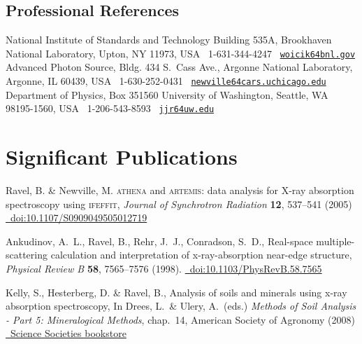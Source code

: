 \documentclass[11pt]{moderncv}
\begin{document}
\subsection{Professional References}
%
{National Institute of Standards and Technology\newline
  Building 535A, Brookhaven National Laboratory, Upton, NY 11973, USA\newline
  \phonesymbol\ 1-631-344-4247\quad
  \emailsymbol\ \href{mailto:woicik@bnl.gov}{\footnotesize\texttt{woicik\char64bnl.gov}}}
%
{Advanced Photon Source, Bldg. 434 S.\ Cass Ave., Argonne National Laboratory, Argonne, IL 60439, USA\newline
  \phonesymbol\ 1-630-252-0431\quad
  \emailsymbol\ \href{mailto:newville@cars.uchicago.edu}
  {\footnotesize\texttt{newville\char64cars.uchicago.edu}}}
%
{Department of Physics, Box 351560\newline
  University of Washington, Seattle, WA 98195-1560, USA\newline
  \phonesymbol\ 1-206-543-8593\quad
  \emailsymbol\ \href{mailto:jjr@uw.edu}{\footnotesize\texttt{jjr\char64uw.edu}}}

\section{Significant Publications}
\label{sec:highlights}

%
{\small Ravel, B. \& Newville, M. \textsc{athena} and
  \textsc{artemis}: data analysis for X-ray absorption spectroscopy
  using \textsc{ifeffit}, \emph{Journal of Synchrotron Radiation}
  \textbf{12}, 537--541 (2005)
  \href{http://dx.doi.org/10.1107/S0909049505012719}
  {\color{quotecolor}\homepagesymbol~doi:10.1107/S0909049505012719}}

%
{\small Ankudinov, A.~L., Ravel, B., Rehr, J.~J., Conradson, S.~D.,
  Real-space multiple-scattering calculation and interpretation of
  x-ray-absorption near-edge structure, \emph{Physical Review B}
  \textbf{58}, 7565--7576 (1998).
  \href{http://dx.doi.org/10.1103/PhysRevB.58.7565}
  {\color{quotecolor}\homepagesymbol~doi:10.1103/PhysRevB.58.7565}}

%
{\small Kelly, S., Hesterberg, D. \& Ravel, B., Analysis of soils and
  minerals using x-ray absorption spectroscopy, In Drees, L.\ \&
  Ulery, A.\ (eds.)  \emph{Methods of Soil Analysis - Part 5:
    Mineralogical Methods}, chap.~14, American Society of Agronomy
  (2008)
  \href{https://portal.sciencesocieties.org/Purchase/ProductDetail.aspx?Product_code=802f0511-76f0-dc11-b6b8-0013210e308c}
  {\color{quotecolor}\homepagesymbol~Science Societies bookstore}}



\nocite{*}


\end{document}
